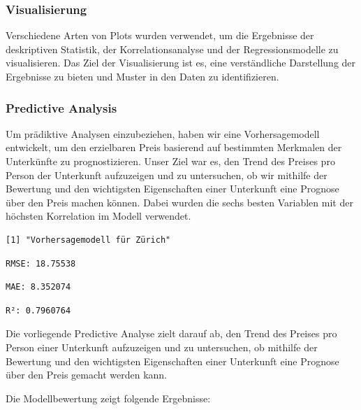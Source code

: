\documentclass[
  journal,
]{IEEEtran}%
\begin{document}
\hypertarget{visualisierung}{%
\subsubsection{\texorpdfstring{\textbf{Visualisierung}}{Visualisierung}}\label{visualisierung}}

Verschiedene Arten von Plots wurden verwendet, um die Ergebnisse der
deskriptiven Statistik, der Korrelationsanalyse und der
Regressionsmodelle zu visualisieren. Das Ziel der Visualisierung ist es,
eine verständliche Darstellung der Ergebnisse zu bieten und Muster in
den Daten zu identifizieren.

\hypertarget{predictive-analysis}{%
\subsubsection{\texorpdfstring{\textbf{Predictive
Analysis}}{Predictive Analysis}}\label{predictive-analysis}}

Um prädiktive Analysen einzubeziehen, haben wir eine Vorhersagemodell
entwickelt, um den erzielbaren Preis basierend auf bestimmten Merkmalen
der Unterkünfte zu prognostizieren. Unser Ziel war es, den Trend des
Preises pro Person der Unterkunft aufzuzeigen und zu untersuchen, ob wir
mithilfe der Bewertung und den wichtigsten Eigenschaften einer
Unterkunft eine Prognose über den Preis machen können. Dabei wurden die
sechs besten Variablen mit der höchsten Korrelation im Modell verwendet.

\begin{verbatim}
[1] "Vorhersagemodell für Zürich"
\end{verbatim}

\begin{verbatim}
RMSE: 18.75538 
\end{verbatim}

\begin{verbatim}
MAE: 8.352074 
\end{verbatim}

\begin{verbatim}
R²: 0.7960764 
\end{verbatim}

Die vorliegende Predictive Analyse zielt darauf ab, den Trend des
Preises pro Person einer Unterkunft aufzuzeigen und zu untersuchen, ob
mithilfe der Bewertung und den wichtigsten Eigenschaften einer
Unterkunft eine Prognose über den Preis gemacht werden kann.

Die Modellbewertung zeigt folgende Ergebnisse:
\end{document}
